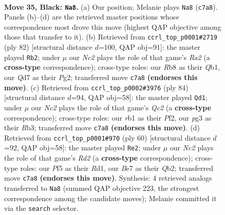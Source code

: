 \documentclass[11pt]{article}
\begin{document}
\clearpage

\begin{figure}[p]\centering
\begin{subfigure}{0.46\textwidth}\centering
\resizebox{\linewidth}{!}{%
\newchessgame
\chessboard[
  setfen={1r4k1/p1nqbrn1/b7/P1p2p1p/3p1Pp1/1P4P1/Q1R1P1BP/1RBNN1K1 b - - 3 35},
  showmover=false,
  pgfstyle=straightmove, color=movearrow, markmove={c7-a8}
]}
\caption{}
\end{subfigure}\hfill
\begin{subfigure}{0.46\textwidth}\centering
\resizebox{\linewidth}{!}{%
\newchessgame
\chessboard[
  setfen={q1rr1bk1/5pp1/1pb1pn1p/p7/P2PP3/3BRN1P/R2B1PP1/1Q4K1 w - - 21 42},
  showmover=false,
  pgfstyle=straightmove, color=movearrow, markmove={a2-b2}
]}
\caption{}
\end{subfigure}
\\[4pt]
\begin{subfigure}{0.46\textwidth}\centering
\resizebox{\linewidth}{!}{%
\newchessgame
\chessboard[
  setfen={6k1/r1b2pp1/r1q4p/2p1p3/n1PpP3/PR1P1N1P/2QB1PP1/R5K1 w - - 10 43},
  showmover=false,
  pgfstyle=straightmove, color=movearrow, markmove={c2-d1}
]}
\caption{}
\end{subfigure}\hfill
\begin{subfigure}{0.46\textwidth}\centering
\resizebox{\linewidth}{!}{%
\newchessgame
\chessboard[
  setfen={1q1rr1k1/1b1nbpp1/pp1pp2p/8/P1PBPP2/1PN3PP/1Q1R2BK/3R4 w - - 19 31},
  showmover=false,
  pgfstyle=straightmove, color=movearrow, markmove={d2-e2}
]}
\caption{}
\end{subfigure}
\caption{\textbf{Move 35, Black: \texttt{Na8}.} (a) Our position; Melanie plays \texttt{Na8} (\texttt{c7a8}). Panels (b)--(d) are the retrieved master positions whose correspondence most drove this move (highest QAP objective among those that transfer to it). (b) Retrieved from \texttt{ccrl\_top\_p0001\#2719} (ply 82) [structural distance $d$=100, QAP obj=91]: the master played \texttt{Rb2}; under $\mu$ our \emph{Nc2} plays the role of that game's \emph{Ra2} (a \textbf{cross-type} correspondence); cross-type roles: our \emph{R}b8 as their \emph{Q}b1, our \emph{Q}d7 as their \emph{P}g2; transferred move \texttt{c7a8} \textbf{(endorses this move)}. (c) Retrieved from \texttt{ccrl\_top\_p0002\#3976} (ply 84) [structural distance $d$=94, QAP obj=58]: the master played \texttt{Qd1}; under $\mu$ our \emph{Nc2} plays the role of that game's \emph{Qc2} (a \textbf{cross-type} correspondence); cross-type roles: our \emph{r}b1 as their \emph{P}f2, our \emph{p}g3 as their \emph{R}b3; transferred move \texttt{c7a8} \textbf{(endorses this move)}. (d) Retrieved from \texttt{ccrl\_top\_p0001\#970} (ply 60) [structural distance $d$=92, QAP obj=58]: the master played \texttt{Re2}; under $\mu$ our \emph{Nc2} plays the role of that game's \emph{Rd2} (a \textbf{cross-type} correspondence); cross-type roles: our \emph{P}f5 as their \emph{R}d1, our \emph{B}e7 as their \emph{Q}b2; transferred move \texttt{c7a8} \textbf{(endorses this move)}. Synthesis: 4 retrieved analogs transferred to \texttt{Na8} (summed QAP objective 223, the strongest correspondence among the candidate moves); Melanie committed it via the \texttt{search} selector.}
\label{fig:thought-m69}
\end{figure}
\end{document}
